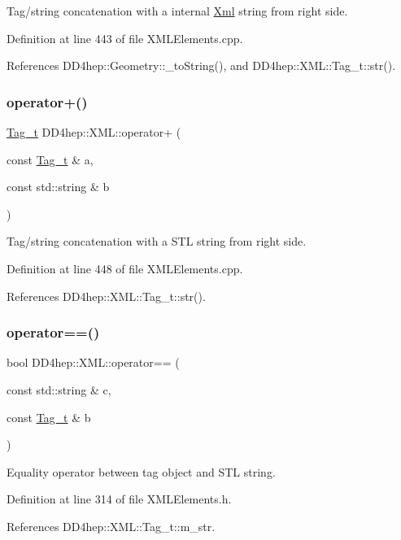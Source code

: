 Tag/string concatenation with a internal \hyperlink{union_xml}{Xml} string from right side. 



Definition at line 443 of file X\+M\+L\+Elements.\+cpp.



References D\+D4hep\+::\+Geometry\+::\+\_\+to\+String(), and D\+D4hep\+::\+X\+M\+L\+::\+Tag\+\_\+t\+::str().

\hypertarget{group___d_d4_h_e_p___x_m_l_ga4296bedbf278d7bbd894b9e07bedf79a}{}\label{group___d_d4_h_e_p___x_m_l_ga4296bedbf278d7bbd894b9e07bedf79a} 
\subsubsection{\texorpdfstring{operator+()}{operator+()}\hspace{0.1cm}{\footnotesize\ttfamily [14/14]}}
{\footnotesize\ttfamily \hyperlink{class_d_d4hep_1_1_x_m_l_1_1_tag__t}{Tag\+\_\+t} D\+D4hep\+::\+X\+M\+L\+::operator+ (\begin{DoxyParamCaption}\item[{const \hyperlink{class_d_d4hep_1_1_x_m_l_1_1_tag__t}{Tag\+\_\+t} \&}]{a,  }\item[{const std\+::string \&}]{b }\end{DoxyParamCaption})}



Tag/string concatenation with a S\+TL string from right side. 



Definition at line 448 of file X\+M\+L\+Elements.\+cpp.



References D\+D4hep\+::\+X\+M\+L\+::\+Tag\+\_\+t\+::str().

\hypertarget{group___d_d4_h_e_p___x_m_l_ga147592045f1692bc1bce671299c71a77}{}\label{group___d_d4_h_e_p___x_m_l_ga147592045f1692bc1bce671299c71a77} 
\subsubsection{\texorpdfstring{operator==()}{operator==()}}
{\footnotesize\ttfamily bool D\+D4hep\+::\+X\+M\+L\+::operator== (\begin{DoxyParamCaption}\item[{const std\+::string \&}]{c,  }\item[{const \hyperlink{class_d_d4hep_1_1_x_m_l_1_1_tag__t}{Tag\+\_\+t} \&}]{b }\end{DoxyParamCaption})\hspace{0.3cm}{\ttfamily [inline]}}



Equality operator between tag object and S\+TL string. 



Definition at line 314 of file X\+M\+L\+Elements.\+h.



References D\+D4hep\+::\+X\+M\+L\+::\+Tag\+\_\+t\+::m\+\_\+str.

